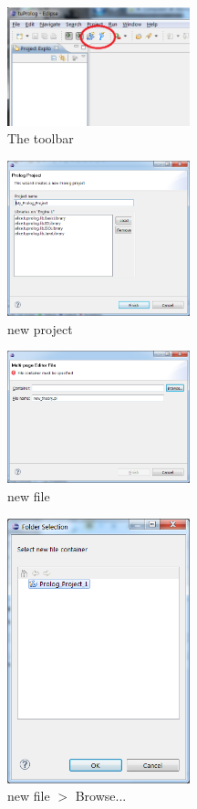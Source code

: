 \begin{figure}
\centering
  \includegraphics[width=200px]{images/plugin1.png}
  \caption{The \tuprolog{} toolbar}\label{fig:plugin1}
\end{figure}

\begin{figure}
\centering
  \includegraphics[width=200px]{images/plugin2.png}
  \caption{new \tuprolog{} project}\label{fig:plugin2}
\end{figure}

\begin{figure}
\centering
  \includegraphics[width=200px]{images/plugin3.png}
  \caption{new \tuprolog{} file}\label{fig:plugin3}
\end{figure}

\begin{figure}
\centering
  \includegraphics[width=200px]{images/plugin4.png}
  \caption{new \tuprolog{} file $>$ Browse...}\label{fig:plugin4}
\end{figure}


